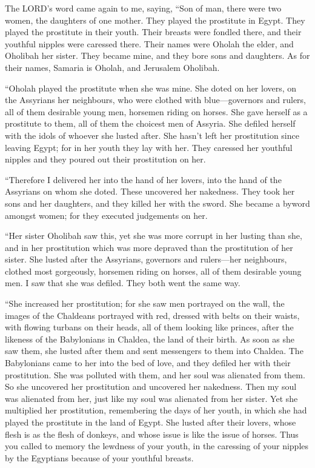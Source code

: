  The LORD's word came again to me, saying, 
``Son of man, there were two women, the daughters of one mother.
 They played the prostitute in Egypt. They played the
prostitute in their youth. Their breasts were fondled there, and their
youthful nipples were caressed there.  Their names were
Oholah the elder, and Oholibah her sister. They became mine, and they
bore sons and daughters. As for their names, Samaria is Oholah, and
Jerusalem Oholibah.

 ``Oholah played the prostitute when she was mine. She doted
on her lovers, on the Assyrians her neighbours,  who were
clothed with blue---governors and rulers, all of them desirable young
men, horsemen riding on horses.  She gave herself as a
prostitute to them, all of them the choicest men of Assyria. She defiled
herself with the idols of whoever she lusted after.  She
hasn't left her prostitution since leaving Egypt; for in her youth they
lay with her. They caressed her youthful nipples and they poured out
their prostitution on her.

 ``Therefore I delivered her into the hand of her lovers,
into the hand of the Assyrians on whom she doted.  These
uncovered her nakedness. They took her sons and her daughters, and they
killed her with the sword. She became a byword amongst women; for they
executed judgements on her.

 ``Her sister Oholibah saw this, yet she was more corrupt
in her lusting than she, and in her prostitution which was more depraved
than the prostitution of her sister.  She lusted after the
Assyrians, governors and rulers---her neighbours, clothed most
gorgeously, horsemen riding on horses, all of them desirable young men.
 I saw that she was defiled. They both went the same way.

 ``She increased her prostitution; for she saw men
portrayed on the wall, the images of the Chaldeans portrayed with red,
 dressed with belts on their waists, with flowing turbans
on their heads, all of them looking like princes, after the likeness of
the Babylonians in Chaldea, the land of their birth.  As
soon as she saw them, she lusted after them and sent messengers to them
into Chaldea.  The Babylonians came to her into the bed of
love, and they defiled her with their prostitution. She was polluted
with them, and her soul was alienated from them.  So she
uncovered her prostitution and uncovered her nakedness. Then my soul was
alienated from her, just like my soul was alienated from her sister.
 Yet she multiplied her prostitution, remembering the days
of her youth, in which she had played the prostitute in the land of
Egypt.  She lusted after their lovers, whose flesh is as
the flesh of donkeys, and whose issue is like the issue of horses.
 Thus you called to memory the lewdness of your youth, in
the caressing of your nipples by the Egyptians because of your youthful
breasts.

